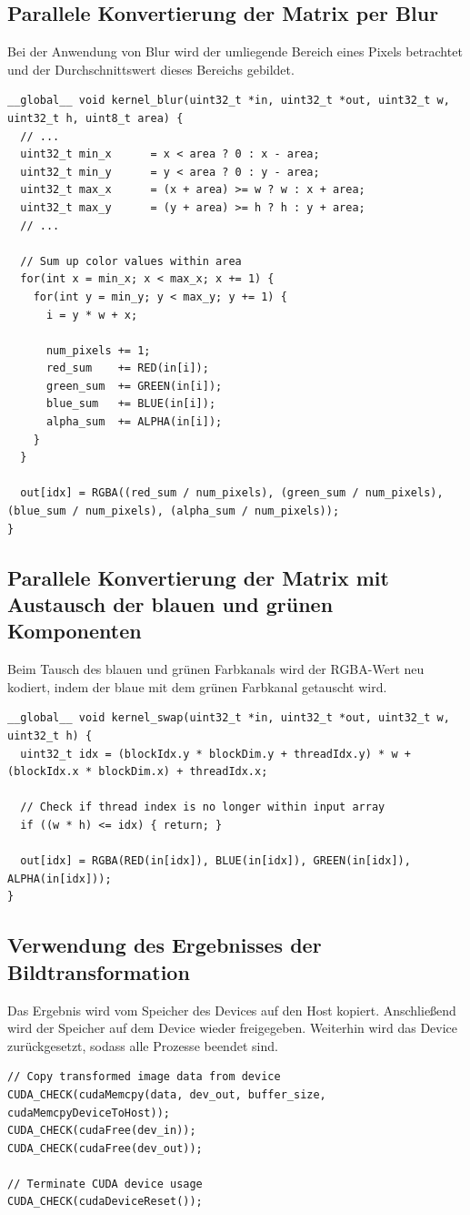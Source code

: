 \documentclass{llncs}
\begin{document}
\subsection{Parallele Konvertierung der Matrix per Blur}
%
Bei der Anwendung von Blur wird der umliegende Bereich eines Pixels betrachtet und der Durchschnittswert dieses Bereichs gebildet.


\begin{lstlisting}
__global__ void kernel_blur(uint32_t *in, uint32_t *out, uint32_t w, uint32_t h, uint8_t area) {
  // ...
  uint32_t min_x      = x < area ? 0 : x - area;
  uint32_t min_y      = y < area ? 0 : y - area;
  uint32_t max_x      = (x + area) >= w ? w : x + area;
  uint32_t max_y      = (y + area) >= h ? h : y + area;
  // ...

  // Sum up color values within area
  for(int x = min_x; x < max_x; x += 1) {
    for(int y = min_y; y < max_y; y += 1) {
      i = y * w + x;

      num_pixels += 1;
      red_sum    += RED(in[i]);
      green_sum  += GREEN(in[i]);
      blue_sum   += BLUE(in[i]);
      alpha_sum  += ALPHA(in[i]);
    }
  }

  out[idx] = RGBA((red_sum / num_pixels), (green_sum / num_pixels), (blue_sum / num_pixels), (alpha_sum / num_pixels));
}
\end{lstlisting}
%
\subsection{Parallele Konvertierung der Matrix mit Austausch der blauen und grünen Komponenten}
%
Beim Tausch des blauen und grünen Farbkanals wird der RGBA-Wert neu kodiert, indem der blaue mit dem grünen Farbkanal getauscht wird.

\begin{lstlisting}
__global__ void kernel_swap(uint32_t *in, uint32_t *out, uint32_t w, uint32_t h) {
  uint32_t idx = (blockIdx.y * blockDim.y + threadIdx.y) * w + (blockIdx.x * blockDim.x) + threadIdx.x;

  // Check if thread index is no longer within input array
  if ((w * h) <= idx) { return; }

  out[idx] = RGBA(RED(in[idx]), BLUE(in[idx]), GREEN(in[idx]), ALPHA(in[idx]));
}
\end{lstlisting}


%
\subsection{Verwendung des Ergebnisses der Bildtransformation}
%
Das Ergebnis wird vom Speicher des Devices auf den Host kopiert. Anschließend wird der Speicher auf dem Device wieder freigegeben. Weiterhin wird das Device zurückgesetzt, sodass alle Prozesse beendet sind.\\
\begin{lstlisting}
// Copy transformed image data from device
CUDA_CHECK(cudaMemcpy(data, dev_out, buffer_size, cudaMemcpyDeviceToHost));
CUDA_CHECK(cudaFree(dev_in));
CUDA_CHECK(cudaFree(dev_out));

// Terminate CUDA device usage
CUDA_CHECK(cudaDeviceReset());
\end{lstlisting}
\end{document}
